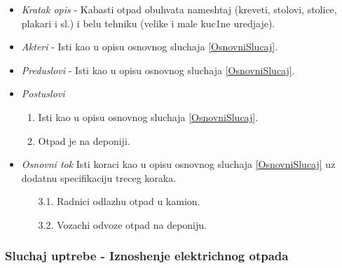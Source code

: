 \documentclass[10 pt]{article}
\begin{document}
		\begin{itemize}
			\item\textit{Kratak opis} - Kabasti otpad obuhvata nameshtaj (kreveti, stolovi, stolice, plakari i sl.) i belu tehniku (velike i male kuc1ne uredjaje).
			
			\item\textit{Akteri} - Isti kao u opisu osnovnog sluchaja \ref{OsnovniSlucaj}.
			
			\item\textit{Preduslovi} - Isti kao u opisu osnovnog sluchaja \ref{OsnovniSlucaj}.
			
			\item\textit{Postuslovi}
				\begin{enumerate}
					\item Isti kao u opisu osnovnog sluchaja \ref{OsnovniSlucaj}.
					\item Otpad je na deponiji.
				\end{enumerate}
			
			\item\textit{Osnovni tok}
				Isti koraci kao u opisu osnovnog sluchaja \ref{OsnovniSlucaj}
				uz dodatnu specifikaciju treceg koraka.
				\begin{enumerate}
					\item [3.1.] Radnici odlazhu otpad u kamion.
					\item [3.2.] Vozachi odvoze otpad na deponiju.
				\end{enumerate}

		\end{itemize}
	
	\subsubsection{Sluchaj uptrebe - Iznoshenje elektrichnog otpada}
		
\end{document}
